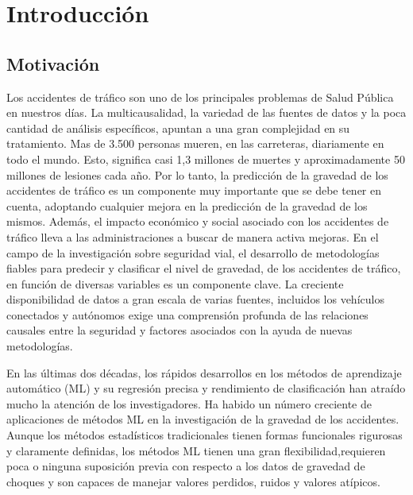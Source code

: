 
\chapter{Introducción}

\section {Motivación}


	Los accidentes de tráﬁco son uno de los principales problemas de Salud Pública en nuestros días. La multicausalidad, la variedad de las fuentes de datos y la poca cantidad de análisis especíﬁcos, apuntan a una gran complejidad en su tratamiento. Mas de 3.500 personas mueren, en las carreteras, diariamente en todo el mundo. Esto, signiﬁca casi 1,3 millones de muertes y aproximadamente 50 millones de lesiones cada año. Por lo tanto, la predicción de la gravedad de los accidentes de tráﬁco es un componente muy importante que se debe tener en cuenta, adoptando cualquier mejora en la predicción de la gravedad de los mismos. Además, el impacto económico y social asociado con los accidentes de tráﬁco lleva a las administraciones a buscar de manera activa mejoras.
	En el campo de la investigación sobre seguridad vial, el desarrollo de metodologías ﬁables para predecir y clasiﬁcar el nivel de gravedad, de los accidentes de tráﬁco, en función de diversas variables es un componente clave. La creciente disponibilidad de datos a gran escala de varias fuentes, incluidos los vehículos conectados y autónomos exige una comprensión profunda de las relaciones causales entre la seguridad y factores asociados con la ayuda de nuevas metodologías.

	En las últimas dos décadas, los rápidos desarrollos en los métodos de aprendizaje automático (ML) y su regresión precisa y rendimiento de clasiﬁcación han atraído mucho la atención de los investigadores. Ha habido un número creciente de aplicaciones de métodos ML en la investigación de la gravedad de los accidentes. Aunque los métodos estadísticos tradicionales tienen formas funcionales rigurosas y claramente deﬁnidas, los métodos ML tienen una gran ﬂexibilidad,requieren poca o ninguna suposición previa con respecto a los datos de gravedad de choques y son capaces de manejar valores perdidos, ruidos y valores atípicos.

